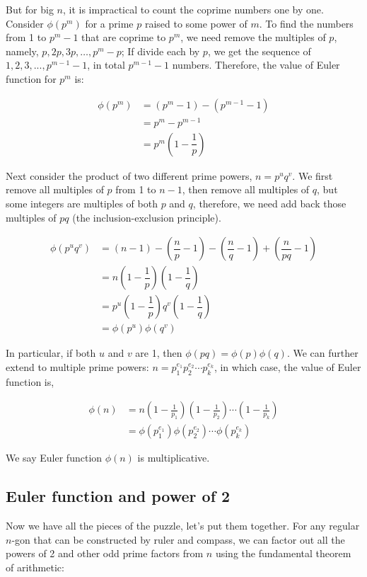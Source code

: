 But for big $n$, it is impractical to count the coprime numbers one by one. Consider $\phi(p^m)$ for a prime $p$ raised to some power of $m$. To find the numbers from 1 to $p^m - 1$ that are coprime to $p^m$, we need remove the multiples of $p$, namely, $p, 2p, 3p, \dotsc, p^m - p$; If divide each by $p$, we get the sequence of $1, 2, 3, ..., p^{m-1} - 1$, in total $p^{m-1} - 1$ numbers. Therefore, the value of Euler function for $p^m$ is:

\begin{align*}
\phi(p^m) &= (p^m - 1) - (p^{m-1} - 1) \\
            &= p^m - p^{m-1} \\
            &= p^m(1-\dfrac{1}{p})
\end{align*}

Next consider the product of two different prime powers, $n = p^u q^v$. We first remove all multiples of $p$ from 1 to $n-1$, then remove all multiples of $q$, but some integers are multiples of both $p$ and $q$, therefore, we need add back those multiples of $pq$ (the inclusion-exclusion principle).

\begin{align*}
\phi(p^uq^v) &=  (n - 1) - (\dfrac{n}{p} - 1) - (\dfrac{n}{q} - 1) + (\dfrac{n}{pq} - 1) \\
          &=  n(1 - \dfrac{1}{p})(1 - \dfrac{1}{q}) \\[5pt]
          &=  p^u(1 - \dfrac{1}{p})q^v(1 - \dfrac{1}{q}) \\[5pt]
          &=  \phi(p^u)\phi(q^v)
\end{align*}

In particular, if both $u$ and $v$ are 1, then $\phi(pq) = \phi(p)\phi(q)$. We can further extend to multiple prime powers: $n = p_1^{e_1} p_2^{e_2} \dotsm p_k^{e_k}$, in which case, the value of Euler function is,

\begin{align*}
\phi(n) &= n(1-\frac{1}{p_1}) (1-\frac{1}{p_2}) \dotsm (1-\frac{1}{p_k}) \\
    &= \phi(p_1^{e_1}) \phi(p_2^{e_2}) \dotsm \phi(p_k^{e_k})
\end{align*}

We say Euler function $\phi(n)$ is multiplicative.

\subsection{Euler function and power of 2}
Now we have all the pieces of the puzzle, let's put them together. For any regular $n$-gon that can be constructed by ruler and compass, we can factor out all the powers of 2 and other odd prime factors from $n$ using the fundamental theorem of arithmetic:

